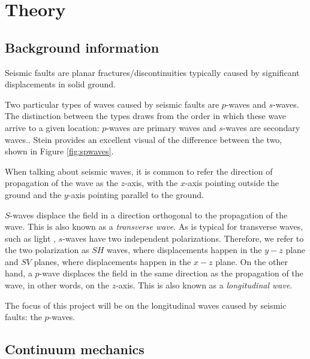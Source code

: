 \chapter{Theory}
\section{Background information}
Seismic faults are planar fractures/discontinuities typically caused by significant displacements in solid ground.

Two particular types of waves caused by seismic faults are $p$-waves and $s$-waves. The distinction between the types draws from the order in which these wave arrive to a given location: $p$-waves are primary waves and $s$-waves are secondary waves.\cite[57]{stein2009introduction}. Stein provides an excellent visual of the difference between the two, shown in Figure \ref{fig:spwaves}.

When talking about seismic waves, it is common to refer the direction of propagation of the wave as the $z$-axis, with the $x$-axis pointing outside the ground and the $y$-axis pointing parallel to the ground.

$S$-waves displace the field in a direction orthogonal to the propagation of the wave. This is also known as a \textit{transverse wave}. As is typical for transverse waves, such as light \cite[57]{stein2009introduction}, $s$-waves have two independent polarizations. Therefore, we refer to the two polarization as $SH$ waves, where displacements happen in the $y-z$ plane and $SV$ planes, where displacements happen in the $x-z$ plane. 
On the other hand, a $p$-wave displaces the field in the same direction as the propagation of the wave, in other words, on the $z$-axis. This is also known as a \textit{longitudinal wave}\cite[57]{stein2009introduction}.

The focus of this project will be on the longitudinal waves caused by seismic faults: the $p$-waves.




\section{Continuum mechanics}
